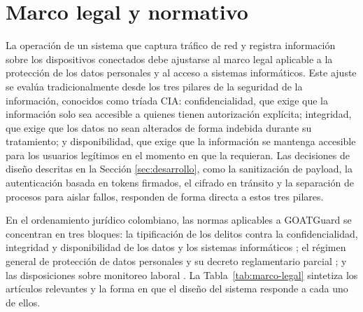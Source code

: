 \section{Marco legal y normativo}
\label{sec:marco-legal}

La operación de un sistema que captura tráfico de red y registra 
información sobre los dispositivos conectados debe ajustarse al marco 
legal aplicable a la protección de los datos personales y al acceso 
a sistemas informáticos. Este ajuste se evalúa tradicionalmente desde 
los tres pilares de la seguridad de la información, conocidos como 
tríada CIA: confidencialidad, que exige que la información solo sea 
accesible a quienes tienen autorización explícita; integridad, que 
exige que los datos no sean alterados de forma indebida durante su 
tratamiento; y disponibilidad, que exige que la información se 
mantenga accesible para los usuarios legítimos en el momento en que 
la requieran. Las decisiones de diseño descritas en la Sección 
\ref{sec:desarrollo}, como la sanitización de payload, la 
autenticación basada en tokens firmados, el cifrado en tránsito y la 
separación de procesos para aislar fallos, responden de forma directa 
a estos tres pilares.

En el ordenamiento jurídico colombiano, las normas aplicables a 
GOATGuard se concentran en tres bloques: la tipificación de los 
delitos contra la confidencialidad, integridad y disponibilidad de 
los datos y los sistemas informáticos \cite{ley1273_2009}; el régimen 
general de protección de datos personales \cite{ley1581_2012} y su 
decreto reglamentario parcial \cite{decreto1377_2013}; y las 
disposiciones sobre monitoreo laboral \cite{ley2466_2025}. La 
Tabla~\ref{tab:marco-legal} sintetiza los artículos relevantes y la 
forma en que el diseño del sistema responde a cada uno de ellos.

